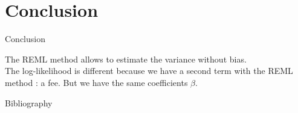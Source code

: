 \documentclass[unknownkeysallowed]{beamer}
\begin{document}
\section{Conclusion}
\label{sec:conclusion}


\begin{frame}{Conclusion}

The REML method allows to estimate the variance without bias.\\
\vspace{0.5cm}
The log-likelihood is different because we have a second term with the REML method : a fee. But we have the same coefficients $\beta$.
\end{frame}

\begin{frame}{Bibliography}
\nocite{*}
\printbibliography
\end{frame}
\end{document}
